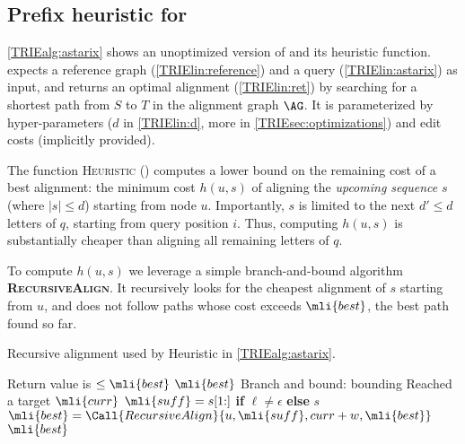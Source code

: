 
%

\subsection{Prefix heuristic for \A} \label{TRIEsubsec:astarix-heuristic}

\cref{TRIEalg:astarix} shows an unoptimized version of \astarix and its heuristic
function.
%
\astarix expects a reference graph (\cref{TRIElin:reference}) and a query
(\cref{TRIElin:astarix}) as input, and returns an optimal alignment (\cref{TRIElin:ret})
by searching for a shortest path from $S$ to $T$ in the alignment graph $\AG$.
It is parameterized by hyper-parameters ($d$ in \cref{TRIElin:d}, more in
\cref{TRIEsec:optimizations}) and edit costs (implicitly provided).

The function \textsc{Heuristic}
() computes a lower bound on
the remaining cost of a best alignment: the minimum cost $h(u,s)$ of aligning
the \emph{upcoming sequence} $s$ (where $\lvert s \rvert \leq d$) starting from
node $u$. Importantly, $s$ is limited to the next $d' \leq d$ letters of $q$,
starting from query position $i$. Thus, computing $h(u,s)$ is substantially
cheaper than aligning all remaining letters of $q$.

To compute $h(u,s)$ we leverage a simple branch-and-bound algorithm
\textbf{\textsc{RecursiveAlign}}. It recursively looks for the cheapest
alignment of $s$ starting from $u$, and does not follow paths whose cost exceeds
$\mli{best}$, the best path found so far.

\begin{algorithm}[t]
	\caption{Recursive alignment used by Heuristic in \cref{TRIEalg:astarix}.}\label{TRIEalg:recursiveAlign}
	\begin{algorithmic}[1]
		\Statex
			 \Comment
			Return value is $\leq \mli{best}$
				\State \Return $\mli{best}$
				\Comment Branch and bound: bounding
			\EndIf
				\Comment Reached a target
				\State \Return $\mli{curr}$
			\EndIf
				\State $\mli{suff} = s[1{:}]$ \textbf{if} $\ell \neq \epsilon$ \textbf{else} $s$
				\State $\mli{best} = \Call{RecursiveAlign}{u, \mli{suff}, curr + w, \mli{best}}$
			\EndFor
			\State \Return $\mli{best}$
		\EndFunction
	\end{algorithmic}
\end{algorithm}

